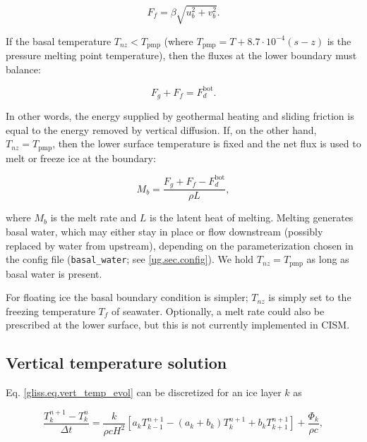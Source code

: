 \begin{equation}
  F_f = \beta \sqrt{u_b^2 + v_b^2}.
\end{equation}

If the basal temperature $T_{nz} < T_{\mathrm{pmp}}$ 
(where $T_{\mathrm{pmp}} = T + 8.7\cdot 10^{-4}(s-z)$ is the pressure melting point temperature),
then the fluxes at the lower boundary must balance:

\begin{equation}
  F_g + F_f = F_{d}^{\mathrm{bot}}.
\end{equation}

\noindent
In other words, the energy supplied by geothermal heating and sliding friction is equal
to the energy removed by vertical diffusion.
If, on the other hand, $T_{nz} = T_{\mathrm{pmp}}$, then the
lower surface temperature is fixed and the net flux is used to melt or freeze ice at the boundary:

\begin{equation}
  \label{gliss.eq.basal_melt}
  M_b = \frac{F_g + F_f - F_d^{\mathrm{bot}}}{\rho L},
\end{equation}
 
\noindent
where $M_b$ is the melt rate and $L$ is the latent heat of melting.
Melting generates basal water, which may either stay in place or flow downstream
(possibly replaced by water from upstream), depending on the
parameterization chosen in the config file (\texttt{basal\_water}; see \ref{ug.sec.config}).
We hold $T_{nz} = T_{\mathrm{pmp}}$ as long as basal water is present.

For floating ice the basal boundary condition is simpler; $T_{nz}$ is simply
set to the freezing temperature $T_f$ of seawater. Optionally, a melt rate could also
be prescribed at the lower surface, but this is not currently implemented in CISM.

\subsection{Vertical temperature solution}

Eq. \eqref{gliss.eq.vert_temp_evol} can be discretized for an ice layer $k$ as

\begin{equation}
  \label{gliss.eq.dTdt1}
  \frac{T_{k}^{n+1}-T_{k}^{n}}{\Delta t} =
  \frac{k}{\rho c H^2}\left[ {{a}_{k}}T_{k-1}^{n+1}-({{a}_{k}}+{{b}_{k}})T_{k}^{n+1}+{{b}_{k}}T_{k+1}^{n+1} \right]+\frac{{{\Phi }_{k}}}{\rho c},
\end{equation}

